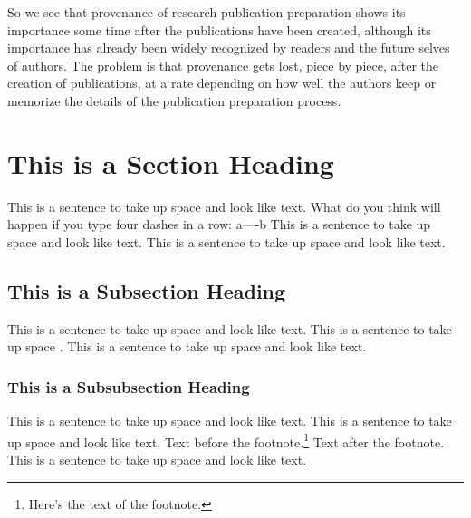 So we see that provenance of research publication preparation shows its importance some time after the publications have been created, although its importance has already been widely recognized by readers and the future selves of authors. The problem is that provenance gets lost, piece by piece, after the creation of publications, at a rate depending on how well the authors keep or memorize the details of the publication preparation process.



\section{This is a Section Heading}
 
This is a sentence to take up space and look like text.
What do you think will happen if you type four dashes in a row: a----b
This is a sentence to take up space and look like text.
This is a sentence to take up space and look like text.
 
\subsection{This is a Subsection Heading} 
 
This is a sentence to take up space and look like text.
This is a sentence to take up space \cite{anotherbook}.
This is a sentence to take up space and look like text.
 
\subsubsection{This is a Subsubsection Heading}
This is a sentence to take up space and look like text.
This is a sentence to take up space and look like text.
Text before the footnote.\footnote{Here's the text of the footnote.}
Text after the footnote. 
This is a sentence to take up space and look like text.

